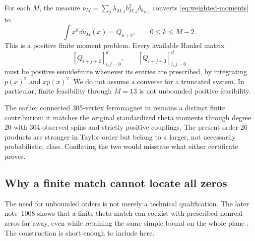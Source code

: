 For each $M$, the measure $\nu_M=\sum_j\lambda_{M,j}b_{M,j}^2\delta_{b_{M,j}}$ converts \eqref{eq:weighted-moments} to
\[
 \int x^k\dd\nu_M(x)=Q_{k+2},\qquad0\le k\le M-2.
\]
This is a positive finite moment problem. Every available Hankel matrix
\[
 [Q_{i+j+2}]_{i,j=0}^d,\qquad [Q_{i+j+3}]_{i,j=0}^d
\]
must be positive semidefinite whenever its entries are prescribed, by integrating $p(x)^2$ and $xp(x)^2$. We do not assume a converse for a truncated system. In particular, finite feasibility through $M=13$ is not unbounded positive feasibility.

The earlier connected 305-vertex ferromagnet in \cite{R994} remains a distinct finite contribution: it matches the original standardized theta moments through degree 20 with 304 observed spins and strictly positive couplings. The present order-26 products are stronger in Taylor order but belong to a larger, not necessarily probabilistic, class. Conflating the two would misstate what either certificate proves.

\subsection{Why a finite match cannot locate all zeros}
The need for unbounded orders is not merely a technical qualification. The later note~1008 shows that a finite theta match can coexist with prescribed nonreal zeros far away, even while retaining the same simple bound on the whole plane \cite{R1008}. The construction is short enough to include here.

